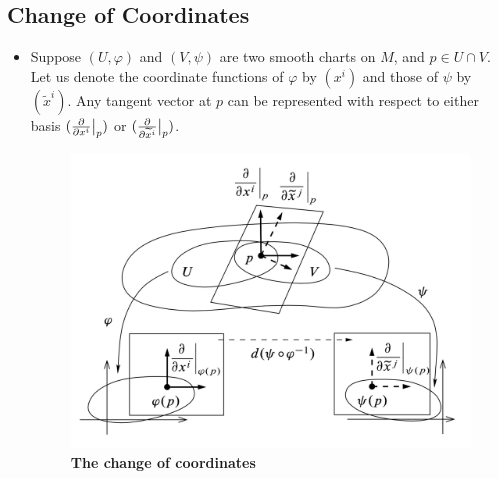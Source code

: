 \documentclass[11pt]{article}
\begin{document}
\subsection{Change of Coordinates}
\begin{itemize}
\item Suppose $(U, \varphi)$ and $(V, \psi)$ are two smooth charts on $M$, and $p \in U \cap V$. Let us denote the coordinate functions of $\varphi$ by $(x^i)$ and those of $\psi$ by $(\widetilde{x}^i)$. Any tangent vector at $p$ can be represented with respect to either basis $(\frac{\partial }{ \partial x^{i}}\big|_{p})$ or $(\frac{\partial }{ \partial \widetilde{x}^{i}}\big|_{p})$. 


\begin{figure}
\begin{minipage}[t]{1\linewidth}
  \centering
  \centerline{\includegraphics[scale = 0.5]{change_of_coordinates.png}}
\end{minipage}
\caption{\footnotesize{\textbf{The change of coordinates \citep{lee2003introduction}}}}
\label{fig: change_of_coordinates}
\end{figure}


\end{itemize}
\end{document}
